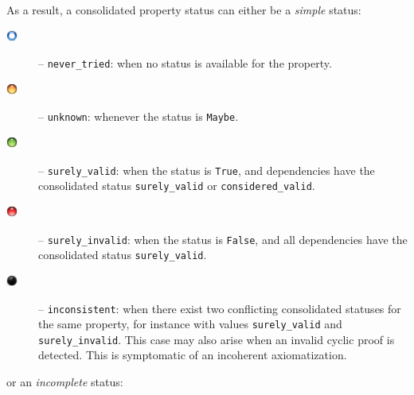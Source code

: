 As a result, a consolidated property status can either be a \emph{simple} status:

\begin{description}
  \item [{\includegraphics[height=1em]{../../share/theme/default/never_tried.png}}] %
  -- \verb+never_tried+: when no status is available for the property.
  \item [{\includegraphics[height=1em]{../../share/theme/default/unknown.png}}] %
  -- \verb+unknown+: whenever the status is \verb+Maybe+.
  \item [{\includegraphics[height=1em]{../../share/theme/default/surely_valid.png}}] %
  -- \verb+surely_valid+: when the status is \verb+True+, and dependencies have the consolidated status
  \verb+surely_valid+ or \verb+considered_valid+.
  \item [{\includegraphics[height=1em]{../../share/theme/default/surely_invalid.png}}] %
  -- \verb+surely_invalid+: when the status is \verb+False+, and all dependencies have the consolidated status
  \verb+surely_valid+.  
  \item [{\includegraphics[height=1em]{../../share/theme/default/inconsistent.png}}] %
  -- \verb+inconsistent+: when there exist two conflicting consolidated statuses for
  the same property, for instance with values \verb+surely_valid+ and
  \verb+surely_invalid+. This case may also arise when an invalid cyclic proof
  is detected. This is symptomatic of an incoherent axiomatization.
\end{description}

or an \emph{incomplete} status:

